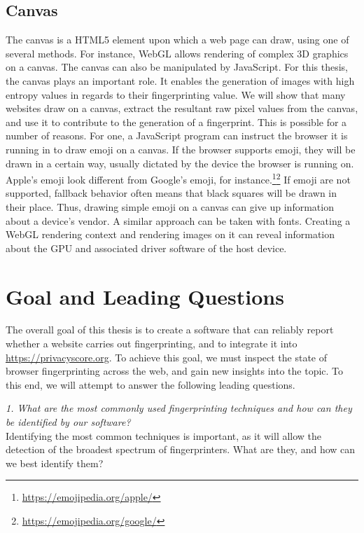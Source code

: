 \documentclass[
    fontsize=12pt,
    headings=small,
    parskip=half,
    bibliography=totoc,
    numbers=noenddot,
    open=any
    ]{scrreprt}
\begin{document}
\subsection{Canvas}
\label{fundamentals:canvas}
The canvas \cite{w3ccanvas} is a HTML5 element upon which a web page can draw,
using one of several methods. For instance, WebGL allows rendering of complex
3D graphics on a canvas.
The canvas can also be manipulated by JavaScript. For this thesis,
the canvas plays an important role. It enables the generation
of images with high entropy values in regards to their fingerprinting value.
We will show that many websites draw on a canvas, extract the resultant raw pixel
values from the canvas, and use it to contribute to the generation of a fingerprint.
This is possible for a number of reasons. For one, a JavaScript program
can instruct the browser it is running in to draw emoji on a canvas.
If the browser supports emoji, they will be drawn in a certain way, usually dictated
by the device the browser is running on. Apple's emoji look different from Google's
emoji, for instance.\footnote{\url{https://emojipedia.org/apple/}}\footnote{\url{https://emojipedia.org/google/}}
If emoji are not supported, fallback behavior often means that black squares will
be drawn in their place.
Thus, drawing simple emoji on a canvas can give up information about a device's vendor.
A similar approach can be taken with fonts.
Creating a WebGL rendering context and rendering images on it can reveal
information about the GPU and associated driver software of the host device.


\section{Goal and Leading Questions}
\label{sec:goal}
The overall goal of this thesis is to create a software that can reliably report whether a website carries out
fingerprinting, and to integrate it into \url{https://privacyscore.org}. To achieve this goal,
we must inspect the state of browser fingerprinting across the web, and gain new insights into the topic.
To this end, we will attempt to answer the following leading questions.

\textit{1. What are the most commonly used fingerprinting techniques and how can they be identified by our software?}\\
Identifying the most common techniques is important, as it will allow the detection of the broadest spectrum
of fingerprinters. What are they, and how can we best identify them?
\end{document}
